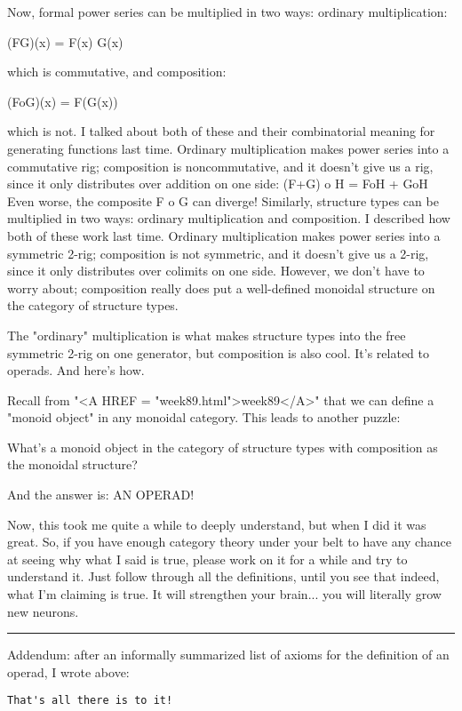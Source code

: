 Now, formal power series can be multiplied in two ways: ordinary
multiplication:

(FG)(x) = F(x) G(x)

which is commutative, and composition: 

(FoG)(x) = F(G(x))

which is not.  I talked about both of these and their combinatorial 
meaning for generating functions last time.  Ordinary multiplication
makes power series into a commutative rig; composition is
noncommutative, and it doesn't give us a rig, since it only distributes 
over addition on one side:
(F+G) o H = FoH + GoH
Even worse, the composite F o G can diverge!
Similarly, structure types can be multiplied in two ways:
ordinary multiplication and composition.  I described how both
of these work last time.  Ordinary multiplication makes power 
series into a symmetric 2-rig; composition is not symmetric, and 
it doesn't give us a 2-rig, since it only distributes over
colimits on one side.  However, we
don't have to worry about; composition really does put
a well-defined monoidal structure on the category of structure types.

The "ordinary" multiplication is what makes structure types into
the free symmetric 2-rig on one generator, but composition is also
cool.  It's related to operads.  And here's how.

Recall from "<A HREF = "week89.html">week89</A>" that we can define a "monoid object" in any
monoidal category.  This leads to another puzzle:

What's a monoid object in the category of structure types 
with composition as the monoidal structure?  

And the answer is: AN OPERAD!

Now, this took me quite a while to deeply understand, but when I did it 
was great.   So, if you have enough category theory under your belt to 
have any chance at seeing why what I said is true, please work on it for 
a while and try to understand it.  Just follow through all the definitions, 
until you see that indeed, what I'm claiming is true.  It will strengthen 
your brain... you will literally grow new neurons.  

\par\noindent\rule{\textwidth}{0.4pt}
Addendum: after an informally summarized list of axioms for the
definition of an operad, I wrote above:
\begin{verbatim}
That's all there is to it!
\end{verbatim}
    
